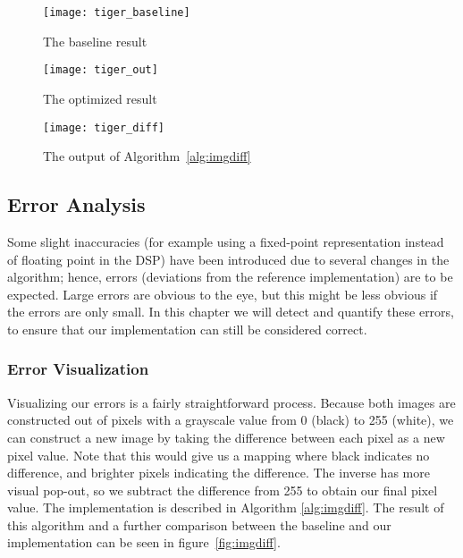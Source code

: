 \begin{figure*}
    \centering
    \begin{subfigure}[b]{0.3\textwidth}
            \texttt{[image: tiger\_baseline]}
            \caption{The baseline result}
            \label{fig:er_tiger_baseline}
    \end{subfigure}
    \begin{subfigure}[b]{0.3\textwidth}
            \texttt{[image: tiger\_out]}
            \caption{The optimized result}
            \label{fig:er_tiger_out}
    \end{subfigure}
    \begin{subfigure}[b]{0.3\textwidth}
            \texttt{[image: tiger\_diff]}
            \caption{The output of Algorithm~\ref{alg:imgdiff}}
            \label{fig:er_tiger_diff}
    \end{subfigure}
    \caption{Using the error visualization on an image of a tiger}
    \label{fig:imgdiff}
\end{figure*}

\subsection{Error Analysis}
Some slight inaccuracies (for example using a fixed-point representation instead of floating point in the DSP) have been introduced due to several changes in the algorithm; hence, errors (deviations from the reference implementation) are to be expected. 
Large errors are obvious to the eye, but this might be less obvious if the errors are only small. In this chapter we will detect and quantify these errors, to ensure that our implementation can still be considered correct.

\subsubsection{Error Visualization}
Visualizing our errors is a fairly straightforward process. Because both images are constructed out of pixels with a grayscale value from 0 (black) to 255 (white), we can construct a new image by taking the difference between each pixel as a new pixel value. Note that this would give us a mapping where black indicates no difference, and brighter pixels indicating the difference. The inverse has more visual pop-out, so we subtract the difference from 255 to obtain our final pixel value. The implementation is described in Algorithm \ref{alg:imgdiff}. The result of this algorithm and a further comparison between the baseline and our implementation can be seen in figure~\ref{fig:imgdiff}.


